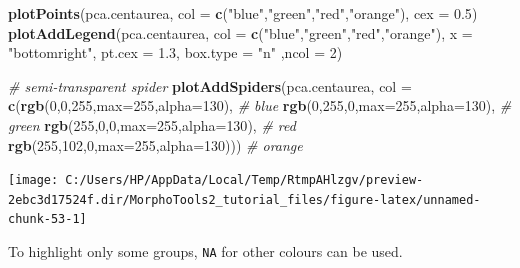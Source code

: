 \documentclass[
]{article}
\newenvironment{Shaded}{\begin{snugshade}}{\end{snugshade}}
\newcommand{\CommentTok}[1]{\textcolor[rgb]{0.56,0.35,0.01}{\textit{#1}}}
\newcommand{\DataTypeTok}[1]{\textcolor[rgb]{0.13,0.29,0.53}{#1}}
\newcommand{\DecValTok}[1]{\textcolor[rgb]{0.00,0.00,0.81}{#1}}
\newcommand{\FloatTok}[1]{\textcolor[rgb]{0.00,0.00,0.81}{#1}}
\newcommand{\KeywordTok}[1]{\textcolor[rgb]{0.13,0.29,0.53}{\textbf{#1}}}
\newcommand{\NormalTok}[1]{#1}
\newcommand{\StringTok}[1]{\textcolor[rgb]{0.31,0.60,0.02}{#1}}
\begin{document}
\begin{Shaded}
\begin{Highlighting}[]
\KeywordTok{plotPoints}\NormalTok{(pca.centaurea, }\DataTypeTok{col =} \KeywordTok{c}\NormalTok{(}\StringTok{"blue"}\NormalTok{,}\StringTok{"green"}\NormalTok{,}\StringTok{"red"}\NormalTok{,}\StringTok{"orange"}\NormalTok{), }\DataTypeTok{cex =} \FloatTok{0.5}\NormalTok{)}
\KeywordTok{plotAddLegend}\NormalTok{(pca.centaurea, }\DataTypeTok{col =} \KeywordTok{c}\NormalTok{(}\StringTok{"blue"}\NormalTok{,}\StringTok{"green"}\NormalTok{,}\StringTok{"red"}\NormalTok{,}\StringTok{"orange"}\NormalTok{), }
               \DataTypeTok{x =} \StringTok{"bottomright"}\NormalTok{, }\DataTypeTok{pt.cex =} \FloatTok{1.3}\NormalTok{, }\DataTypeTok{box.type =} \StringTok{"n"}\NormalTok{ ,}\DataTypeTok{ncol =} \DecValTok{2}\NormalTok{)}

\CommentTok{# semi-transparent spider}
\KeywordTok{plotAddSpiders}\NormalTok{(pca.centaurea, }\DataTypeTok{col =} \KeywordTok{c}\NormalTok{(}\KeywordTok{rgb}\NormalTok{(}\DecValTok{0}\NormalTok{,}\DecValTok{0}\NormalTok{,}\DecValTok{255}\NormalTok{,}\DataTypeTok{max=}\DecValTok{255}\NormalTok{,}\DataTypeTok{alpha=}\DecValTok{130}\NormalTok{), }\CommentTok{# blue}
                                      \KeywordTok{rgb}\NormalTok{(}\DecValTok{0}\NormalTok{,}\DecValTok{255}\NormalTok{,}\DecValTok{0}\NormalTok{,}\DataTypeTok{max=}\DecValTok{255}\NormalTok{,}\DataTypeTok{alpha=}\DecValTok{130}\NormalTok{), }\CommentTok{# green}
                                      \KeywordTok{rgb}\NormalTok{(}\DecValTok{255}\NormalTok{,}\DecValTok{0}\NormalTok{,}\DecValTok{0}\NormalTok{,}\DataTypeTok{max=}\DecValTok{255}\NormalTok{,}\DataTypeTok{alpha=}\DecValTok{130}\NormalTok{), }\CommentTok{# red}
                                      \KeywordTok{rgb}\NormalTok{(}\DecValTok{255}\NormalTok{,}\DecValTok{102}\NormalTok{,}\DecValTok{0}\NormalTok{,}\DataTypeTok{max=}\DecValTok{255}\NormalTok{,}\DataTypeTok{alpha=}\DecValTok{130}\NormalTok{))) }\CommentTok{# orange}
\end{Highlighting}
\end{Shaded}

\begin{center}\texttt{[image: C:/Users/HP/AppData/Local/Temp/RtmpAHlzgv/preview-2ebc3d17524f.dir/MorphoTools2\_tutorial\_files/figure-latex/unnamed-chunk-53-1]} \end{center}

To highlight only some groups, \texttt{NA} for other colours can be
used.
\end{document}

